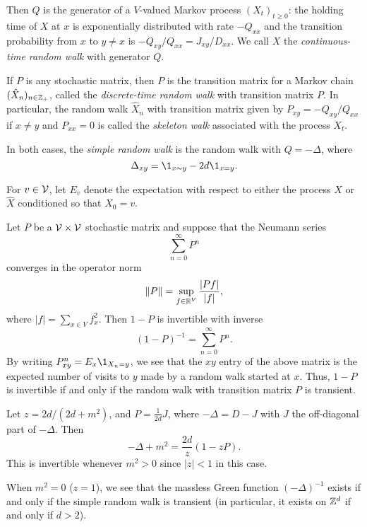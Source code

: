 Then $Q$ is the generator of a $V$-valued Markov process $(X_t)_{t \ge 0}$:
the holding time of $X$ at $x$ is exponentially distributed with rate $-Q_{xx}$
and the transition probability from $x$ to $y \ne x$ is
$-Q_{xy} / Q_{xx} = J_{xy} / D_{xx}$.
We call $X$ the \emph{continuous-time random walk} with generator $Q$.

If $P$ is any stochastic matrix, then $P$ is the transition matrix for a Markov chain
$(\hat X_n)_{n\in{\mathbb Z}_+}$, called the \emph{discrete-time random walk} with transition matrix $P$.
In particular, the random walk $\hat X_n$ with transition matrix given by
$P_{xy} = -Q_{xy} / Q_{xx}$ if $x \ne y$ and $P_{xx} = 0$ is called the \emph{skeleton
walk} associated with the process $X_t$.

In both cases, the \emph{simple random walk} is the random walk with $Q = -\Delta$,
where
\begin{equation}
\Delta_{xy} = \1_{x \sim y} - 2 d \1_{x=y}.
\end{equation}

For $v \in \mathcal{V}$, let $E_v$ denote the expectation
with respect to either the process $X$ or $\hat X$ conditioned so that $X_0 = v$.

\begin{example}
Let $P$ be a $\mathcal{V} \times \mathcal{V}$ stochastic matrix and suppose that the Neumann series
\begin{equation}
\sum_{n=0}^\infty P^n
\end{equation}
converges in the operator norm
\begin{equation}
\|P\| = \sup_{f \in {\mathbb R}^V} \frac{|P f|}{|f|},
\end{equation}
where $|f| = \sum_{x\in V} f_x^2$. Then $1 - P$ is invertible with inverse
\begin{equation}
(1 - P)^{-1} = \sum_{n=0}^\infty P^n.
\end{equation}
By writing $P^n_{xy} = E_x \1_{X_n=y}$, we see that the $xy$ entry of the
above matrix is the expected number of visits to $y$ made by a random walk
started at $x$. Thus, $1 - P$ is invertible if and only if the random walk
with transition matrix $P$ is transient. 

Let $z = 2 d / (2 d + m^2)$, and $P = \frac{1}{2 d} J$,
where $-\Delta = D - J$ with $J$ the off-diagonal part of $-\Delta$. Then
\begin{equation}
-\Delta + m^2 = \frac{2 d}{z} (1 - z P).
\end{equation}
This is invertible whenever $m^2 > 0$ since $|z| < 1$ in this case.

When $m^2 = 0$ ($z = 1$), we see that the massless Green function $(-\Delta)^{-1}$
exists if and only if the simple random walk is transient (in particular, it exists on
${ {{\mathbb Z}}^d }$ if and only if $d > 2$).
\end{example}

